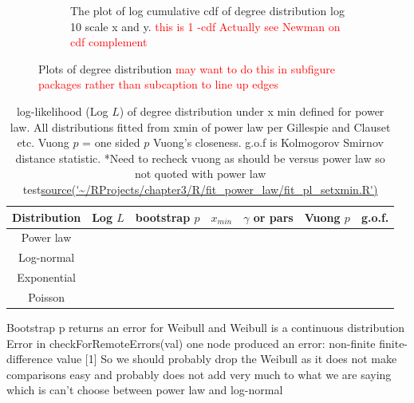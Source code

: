 \begin{figure}
\begin{subfigure}[t]{0.45\textwidth}
        \caption{The plot of log cumulative cdf of degree distribution log 10 scale x and y. \textcolor{red}{this is 1 -cdf Actually see Newman on cdf complement}} \label{fig:log_degree_distribution}
    \end{subfigure}
    \caption{Plots of degree distribution \textcolor{red}{may want to do this in subfigure packages rather than subcaption to line up edges}}
    \label{fig:Plots of degree distribution}
\end{figure}




\begin{table}[]
    \centering
    
    \begin{tabular}{ccccccc}
    \toprule
        Distribution & Log $L$ & bootstrap $p$ & $x_{min}$ & $\gamma$ or pars & Vuong $p$  &g.o.f.\\
        \midrule
        Power law \\
        Log-normal \\
        Exponential \\
        Poisson \\
    
        \bottomrule
    \end{tabular}
    \caption[Log $L$ of degree distribution under different models]{log-likelihood (Log $L$) of degree distribution under x min defined for power law. All distributions fitted from xmin of power law per Gillespie and Clauset etc. Vuong $p$ = one sided $p$ Vuong's closeness. g.o.f is Kolmogorov Smirnov distance statistic. *Need to recheck vuong as should be versus power law so not quoted with power law test\url{source('~/RProjects/chapter3/R/fit_power_law/fit_pl_setxmin.R')} }
    \tiny{Bootstrap p returns an error for Weibull and Weibull is a continuous distribution Error in checkForRemoteErrors(val) one node produced an error: non-finite finite-difference value [1] So we should probably drop the Weibull as it does not make comparisons easy and probably does not add very much to what we are saying which is can't choose between power law and log-normal}
    \label{tab:ll distributions}
\end{table}
